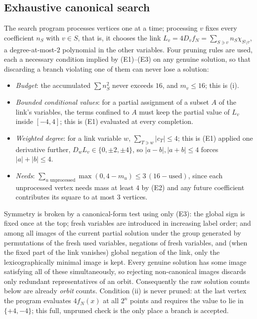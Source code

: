 \documentclass[11pt,reqno]{amsart}
\theoremstyle{plain}
\theoremstyle{definition}
\numberwithin{theorem}{section}
\begin{document}
\subsection{Exhaustive canonical search}
The search program processes vertices one at a time; processing $v$ fixes every coefficient
$n_S$ with $v \in S$, that is, it chooses the link
$L_v = 4 D_v f_N = \sum_{S \ni v} n_S \chi_{S \setminus v}$, a degree-at-most-$2$ polynomial in
the other variables. Four pruning rules are used, each a necessary condition implied by
(E1)--(E3) on any genuine solution, so that discarding a branch violating one of them can never
lose a solution:
\begin{itemize}[leftmargin=1.4em]
  \item[(P1)] \emph{Budget}: the accumulated $\sum n_S^2$ never exceeds $16$, and $m_v \le 16$;
  this is (i).
  \item[(P2)] \emph{Bounded conditional values}: for a partial assignment of a subset $A$ of the
  link's variables, the terms confined to $A$ must keep the partial value of $L_v$ inside
  $[-4,4]$; this is (E1) evaluated at every completion.
  \item[(P3)] \emph{Weighted degree}: for a link variable $w$, $\sum_{T \ni w} |c_T| \le 4$;
  this is (E1) applied one derivative further, $D_w L_v \in \{0,\pm2,\pm4\}$, so
  $|a - b|, |a+b| \le 4$ forces $|a| + |b| \le 4$.
  \item[(P4)] \emph{Needs}: $\sum_{u \text{ unprocessed}} \max(0, 4 - m_u) \le 3\,(16 -
  \text{used})$, since each unprocessed vertex needs mass at least $4$ by (E2) and any future
  coefficient contributes its square to at most $3$ vertices.
\end{itemize}
Symmetry is broken by a canonical-form test using only (E3): the global sign is fixed once at
the top; fresh variables are introduced in increasing label order; and among all images of the
current partial solution under the group generated by permutations of the fresh used variables,
negations of fresh variables, and (when the fixed part of the link vanishes) global negation of
the link, only the lexicographically minimal image is kept. Every genuine solution has some
image satisfying all of these simultaneously, so rejecting non-canonical images discards only
redundant representatives of an orbit. Consequently the raw solution counts below are already
\emph{orbit} counts. Condition (ii) is never pruned: at the last vertex the program evaluates
$4 f_N(x)$ at all $2^n$ points and requires the value to lie in $\{+4,-4\}$; this full, unpruned
check is the only place a branch is accepted.
\end{document}

